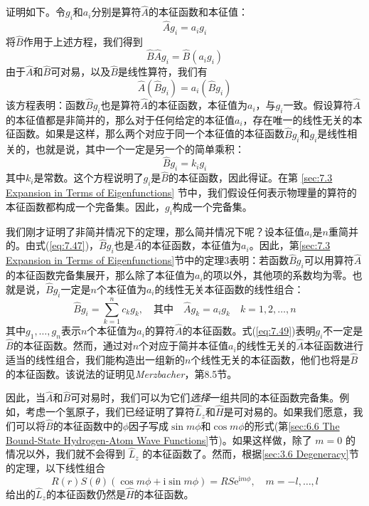     证明如下。令$g_i$和$a_i$分别是算符$\hat{A}$的本征函数和本征值：
    \begin{equation*}
        \hat{A}g_i = a_ig_i
    \end{equation*}
    将$\hat{B}$作用于上述方程，我们得到
    \begin{equation*}
        \hat{B}\hat{A}g_i = \hat{B}\left(a_ig_i\right)
    \end{equation*}
    由于$\hat{A}$和$\hat{B}$可对易，以及$\hat{B}$是线性算符，我们有
    \begin{equation}
        \hat{A}\left(\hat{B}g_i\right) = a_i\left(\hat{B}g_i\right)
        \label{eq:7.47}
    \end{equation}
    该方程表明：函数$\hat{B}g_i$也是算符$\hat{A}$的本征函数，本征值为$a_i$，与$g_i$一致。假设算符$\hat{A}$的本征值都是非简并的，那么对于任何给定的本征值$a_i$，存在唯一的线性无关的本征函数。如果是这样，那么两个对应于同一个本征值的本征函数$\hat{B}g_i$和$g_i$是线性相关的，也就是说，其中一个一定是另一个的简单乘积：
    \begin{equation}
        \hat{B}g_i = k_ig_i
        \label{eq:7.48}
    \end{equation}
    其中$k_i$是常数。这个方程说明了$g_i$是$\hat{B}$的本征函数，因此得证。在第 \ref{sec:7.3 Expansion in Terms of Eigenfunctions} 节中，我们假设任何表示物理量的算符的本征函数都构成一个完备集。因此，$g_i$构成一个完备集。

    我们刚才证明了非简并情况下的定理，那么简并情况下呢？设本征值$a_i$是$n$重简并的。由式(\ref{eq:7.47})，$\hat{B}g_i$也是$\hat{A}$的本征函数，本征值为$a_i$。因此，第\ref{sec:7.3 Expansion in Terms of Eigenfunctions}节中的定理3表明：若函数$\hat{B}g_i$可以用算符$\hat{A}$的本征函数完备集展开，那么除了本征值为$a_i$的项以外，其他项的系数均为零。也就是说，$\hat{B}g_i$一定是$n$个本征值为$a_i$的线性无关本征函数的线性组合：
    \begin{equation}
        \hat{B}g_i = \sum_{k=1}^{n}c_kg_k, \quad \text{其中} \quad \hat{A}g_k = a_ig_k \quad k = 1,2,\ldots,n
        \label{eq:7.49}
    \end{equation}
    其中$g_1,\ldots,g_n$表示$n$个本征值为$a_i$的算符$\hat{A}$的本征函数。式(\ref{eq:7.49})表明$g_i$不一定是$\hat{B}$的本征函数。然而，通过对$n$个对应于简并本征值$a_i$的线性无关的$\hat{A}$本征函数进行适当的线性组合，我们能构造出一组新的$n$个线性无关的本征函数，他们也将是$\hat{B}$的本征函数。该说法的证明见\textit{Merzbacher}，第8.5节。

    因此，当$\hat{A}$和$\hat{B}$可对易时，我们可以为它们\textit{选择}一组共同的本征函数完备集。例如，考虑一个氢原子，我们已经证明了算符$\hat{L}_z$和$\hat{H}$是可对易的。如果我们愿意，我们可以将$\hat{B}$的本征函数中的$\phi$因子写成$\sin m\phi$和$\cos m\phi$的形式(第\ref{sec:6.6 The Bound-State Hydrogen-Atom Wave Functions}节)。如果这样做，除了 $m=0$ 的情况以外，我们就不会得到 $\hat{L}_z$ 的本征函数了。然而，根据\ref{sec:3.6 Degeneracy}节的定理，以下线性组合
    \begin{equation*}
        R\left(r\right)S\left(\theta\right)\left(\cos m\phi+\mathrm{i}\sin m\phi\right) = RS\mathrm{e}^{\mathrm{i}m\phi}, \quad m = -l,\ldots,l
    \end{equation*}
    给出的$\hat{L}_z$的本征函数仍然是$\hat{H}$的本征函数。

